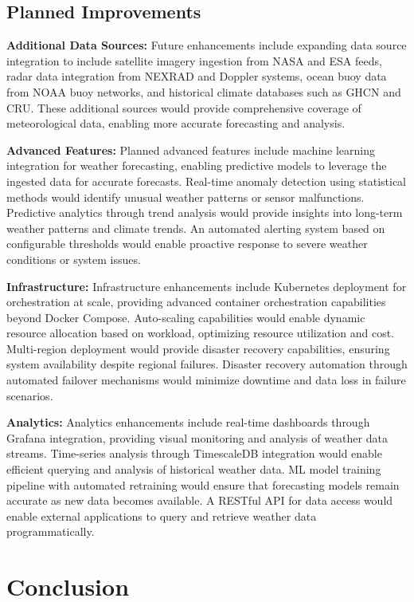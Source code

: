 \documentclass[12pt,a4paper]{article}
\begin{document}
\subsection{Planned Improvements}

\textbf{Additional Data Sources:} Future enhancements include expanding data source integration to include satellite imagery ingestion from NASA and ESA feeds, radar data integration from NEXRAD and Doppler systems, ocean buoy data from NOAA buoy networks, and historical climate databases such as GHCN and CRU. These additional sources would provide comprehensive coverage of meteorological data, enabling more accurate forecasting and analysis.

\textbf{Advanced Features:} Planned advanced features include machine learning integration for weather forecasting, enabling predictive models to leverage the ingested data for accurate forecasts. Real-time anomaly detection using statistical methods would identify unusual weather patterns or sensor malfunctions. Predictive analytics through trend analysis would provide insights into long-term weather patterns and climate trends. An automated alerting system based on configurable thresholds would enable proactive response to severe weather conditions or system issues.

\textbf{Infrastructure:} Infrastructure enhancements include Kubernetes deployment for orchestration at scale, providing advanced container orchestration capabilities beyond Docker Compose. Auto-scaling capabilities would enable dynamic resource allocation based on workload, optimizing resource utilization and cost. Multi-region deployment would provide disaster recovery capabilities, ensuring system availability despite regional failures. Disaster recovery automation through automated failover mechanisms would minimize downtime and data loss in failure scenarios.

\textbf{Analytics:} Analytics enhancements include real-time dashboards through Grafana integration, providing visual monitoring and analysis of weather data streams. Time-series analysis through TimescaleDB integration would enable efficient querying and analysis of historical weather data. ML model training pipeline with automated retraining would ensure that forecasting models remain accurate as new data becomes available. A RESTful API for data access would enable external applications to query and retrieve weather data programmatically.




\section{Conclusion}
\end{document}
